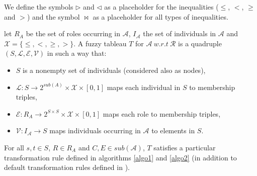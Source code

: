 		We define the symbols  $\rhd$ and  $\lhd$ as a placeholder for the  inequalities 
		($\leq$, $<$, $\geq$ and $>$) and the symbol $\bowtie$ as a placeholder for all types of inequalities.
		
		\begin{definition}
			let $R_{A}$ be the set of roles occurring in $\mathcal{A}$, $I_{\mathcal{A}}$ the set 
			of individuals in $\mathcal{A}$ and $\mathcal{X} = \{\leq, <, \geq, >\}$. A fuzzy tableau 
			$T$ for $\mathcal{A} ~ w.r.t ~ \mathcal{R}$ is a quadruple
			$(S, \mathcal{L, E, V})$ in such a way that:
			\begin{itemize}
				\item $S$ is a nonempty set of individuals (considered also as nodes),
				\item $\mathcal{L} : S \longrightarrow 2^{sub(A)} \times \mathcal{X} \times [0,1]$ 
					maps each individual in $S$ to membership triples,
				\item $\mathcal{E} : R_{A} \longrightarrow 2^{S \times S} \times \mathcal{X} \times [0,1]$ 
					maps each role to membership triples,
				\item $\mathcal{V} : I_{\mathcal{A}} \longrightarrow S$ maps individuals occurring in 
					$\mathcal{A}$ to elements in $S$.
			\end{itemize}
		For all	$s,t \in S$, $R\in R_ {A}$ and $C,E \in sub(\mathcal{A})$, $T$ satisfies a particular 
		transformation rule defined in algorithms \ref{algo1} and \ref{algo2}
		(in addition to default transformation rules defined in \cite{Stoilos2005}).	


\end{definition}

